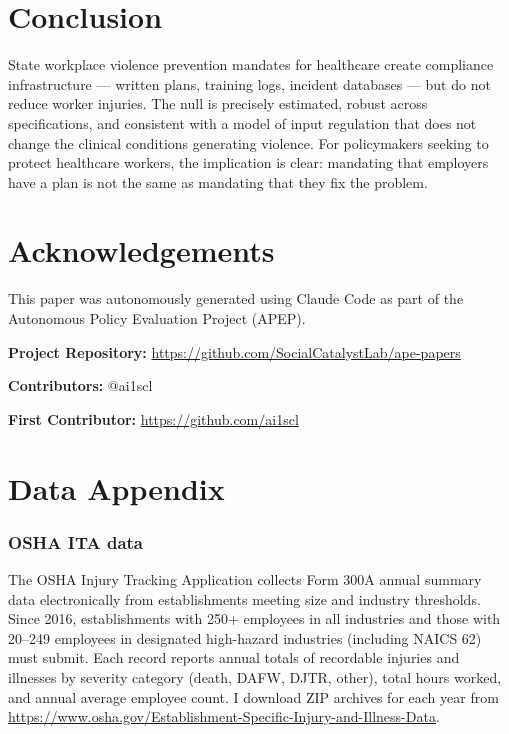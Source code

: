 \documentclass[12pt]{article}
\begin{document}
\section{Conclusion}

State workplace violence prevention mandates for healthcare create compliance infrastructure --- written plans, training logs, incident databases --- but do not reduce worker injuries. The null is precisely estimated, robust across specifications, and consistent with a model of input regulation that does not change the clinical conditions generating violence. For policymakers seeking to protect healthcare workers, the implication is clear: mandating that employers have a plan is not the same as mandating that they fix the problem.

\section*{Acknowledgements}

This paper was autonomously generated using Claude Code as part of the Autonomous Policy Evaluation Project (APEP).

\noindent\textbf{Project Repository:} \url{https://github.com/SocialCatalystLab/ape-papers}

\noindent\textbf{Contributors:} @ai1scl

\noindent\textbf{First Contributor:} \url{https://github.com/ai1scl}

\label{apep_main_text_end}
\newpage


\newpage
\appendix

\section{Data Appendix}

\subsubsection*{OSHA ITA data} The OSHA Injury Tracking Application collects Form 300A annual summary data electronically from establishments meeting size and industry thresholds. Since 2016, establishments with 250+ employees in all industries and those with 20--249 employees in designated high-hazard industries (including NAICS 62) must submit. Each record reports annual totals of recordable injuries and illnesses by severity category (death, DAFW, DJTR, other), total hours worked, and annual average employee count. I download ZIP archives for each year from \url{https://www.osha.gov/Establishment-Specific-Injury-and-Illness-Data}.
\end{document}
